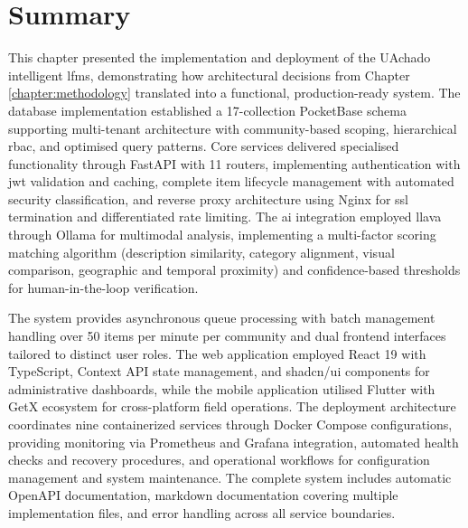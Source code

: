 \section{Summary} \label{section:implementation_summary}

This chapter presented the implementation and deployment of the UAchado intelligent \ac{lfms}, demonstrating how architectural decisions from Chapter \ref{chapter:methodology} translated into a functional, production-ready system. The database implementation established a 17-collection PocketBase schema supporting multi-tenant architecture with community-based scoping, hierarchical \ac{rbac}, and optimised query patterns. Core services delivered specialised functionality through FastAPI with 11 routers, implementing authentication with \ac{jwt} validation and caching, complete item lifecycle management with automated security classification, and reverse proxy architecture using Nginx for \ac{ssl} termination and differentiated rate limiting. The \ac{ai} integration employed \ac{llava} through Ollama for multimodal analysis, implementing a multi-factor scoring matching algorithm (description similarity, category alignment, visual comparison, geographic and temporal proximity) and confidence-based thresholds for human-in-the-loop verification.

The system provides asynchronous queue processing with batch management handling over 50 items per minute per community and dual frontend interfaces tailored to distinct user roles. The web application employed React 19 with TypeScript, Context API state management, and shadcn/ui components for administrative dashboards, while the mobile application utilised Flutter with GetX ecosystem for cross-platform field operations. The deployment architecture coordinates nine containerized services through Docker Compose configurations, providing monitoring via Prometheus and Grafana integration, automated health checks and recovery procedures, and operational workflows for configuration management and system maintenance. The complete system includes automatic OpenAPI documentation, markdown documentation covering multiple implementation files, and error handling across all service boundaries.